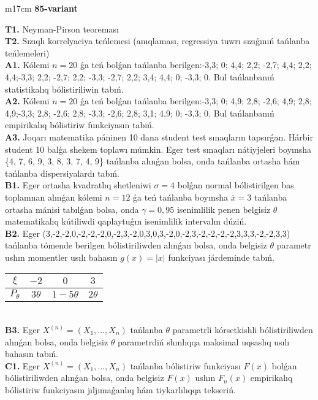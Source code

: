 \documentclass{article}
\begin{document}
\begin{tabular}{m{17cm}}
\textbf{85-variant}
\newline

\textbf{T1.} 
Neyman-Pirson teoreması
 \\
\textbf{T2.} 
Sızıqlı korrelyaciya teńlemesi (anıqlaması, regressiya tuwrı sızıǵınıń tańlanba teńlemeleri)
 \\
\textbf{A1.} 
Kólemi \(n = 20\) ǵa teń bolǵan tańlanba berilgen:-3,3; 0; 4,4; 2,2; -2,7; 4,4; 2,2; 4,4;-3,3; 2,2; -2,7; 2,2; -3,3; -2,7; 2,2; 3,4; 4,4; 0; -3,3; 0. Bul tańlanbanıń statistikalıq bólistiriliwin tabıń.
 \\
\textbf{A2.} 
Kólemi \(n = 20\) ǵa teń bolǵan tańlanba berilgen:-3,3; 0; 4,9; 2,8; -2,6; 4,9; 2,8; 4,9;-3,3; 2,8; -2,6; 2,8; -3,3; -2,6; 2,8; 3,1; 4,9; 0; -3,3; 0. Bul tańlanbanıń empirikalıq bólistiriw funkciyasın tabıń.
 \\
\textbf{A3.} 
Joqarı matematika páninen 10 dana student test sınaqların tapsırǵan. Hárbir student 10 balǵa shekem toplawı múmkin. Eger test sınaqları nátiyjeleri boyınsha \{4, 7, 6, 9, 3, 8, 3, 7, 4, 9\} tańlanba alınǵan bolsa, onda tańlanba ortasha hám tańlanba dispersiyalardı tabıń.
 \\
\textbf{B1.} 
Eger ortasha kvadratlıq shetleniwi \(\sigma = 4\) bolǵan normal bólistirilgen bas toplamnan alınǵan kólemi \(n = 12\) ǵa teń tańlanba boyınsha \(\overline{x} = 3\) tańlanba ortasha mánisi tabılǵan bolsa, onda \(\gamma = 0,95\) isenimlilik penen belgisiz \(\theta\) matematikalıq kútiliwdi qaplaytuǵın isenimlilik intervalın dúziń.
 \\
\textbf{B2.} 
Eger (3,-2,-2,0,-2,-2,-2,0,-2,3,-2,0,3,0,3,-2,0,-2,3,-2,-2,-2,-2,3,3,3,-2,-2,3,3) tańlanba tómende berilgen bólistiriliwden alınǵan bolsa, onda belgisiz \(\theta\) parametr ushın momentler usılı bahasın \(g(x) = |x|\) funkciyası járdeminde tabıń.
\begin{tabular}{|c|c|c|c|}
  \hline
$\xi$ &
$- 2$ &
$0$ &
$3$ \\
\hline
\(P_{\theta}\) & \(3\theta\) & \(1 - 5\theta\) & \(2\theta\) \\
\hline
\end{tabular}
 \\
\textbf{B3.} 
Eger \(X^{(n)} = \left( X_{1},...,X_{n} \right)\) tańlanba \(\theta\) parametrli kórsetkishli bólistiriliwden alınǵan bolsa, onda belgisiz \(\theta\) parametrdiń shınlıqqa maksimal uqsaslıq usılı bahasın tabıń.
 \\
\textbf{C1.} 
Eger \(X^{(n)} = \left( X_{1},...,X_{n} \right)\) tańlanba bólistiriw funkciyası \(F(x)\) bolǵan bólistiriliwden alınǵan bolsa, onda belgisiz \(F(x)\) ushın \(F_{n}(x)\) empirikalıq bólistiriw funkciyasın jıljımaǵanlıq hám tiykarlılıqqa tekseriń.

\end{tabular}
\end{document}
